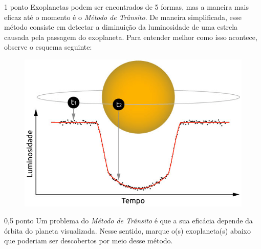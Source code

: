 \documentclass{../lista}
\begin{document}
	\begin{questao}{1 ponto}
		Exoplanetas podem ser encontrados de 5 formas, mas a maneira mais eficaz até o momento é o \textit{Método de Trânsito}. De maneira simplificada, esse método consiste em detectar a diminuição da luminosidade de uma estrela causada pela passagem do exoplaneta. Para entender melhor como isso acontece, observe o esquema seguinte:
		\begin{figure}[H]
			\centering
			\includegraphics[scale=0.7]{./img/5a.png}
		\end{figure}

		\begin{pergunta}{0,5 ponto}
			Um problema do \textit{Método de Trânsito} é que a sua eficácia depende da órbita do planeta visualizada. Nesse sentido, marque o(s) exoplaneta(s) abaixo que poderiam ser descobertos por meio desse método.


\end{pergunta}
\end{questao}
\end{document}
